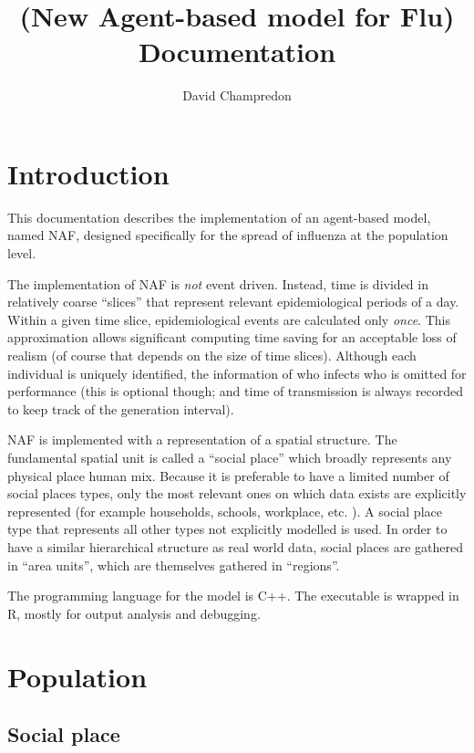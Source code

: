 \documentclass[11pt, onecolumn]{article}
\title{\naf (New Agent-based model for Flu) Documentation}
\author{David Champredon}
\newcommand{\naf}{\textsf{NAF}\xspace}
\begin{document}
\maketitle

\vspace{1cm}

\tableofcontents

\newpage

\section{Introduction}

This documentation describes the implementation of an agent-based model, named \naf, designed specifically for the spread of influenza at the population level. 

The implementation of \naf is \emph{not} event driven. Instead, time is divided in relatively coarse ``slices'' that represent relevant epidemiological periods of a day. Within a given time slice, epidemiological events are calculated only \emph{once}. This approximation allows significant computing time saving for an acceptable loss of realism (of course that depends on the size of time slices). Although each individual is uniquely identified, the information of who infects who is omitted for performance (this is optional though; and time of transmission is always recorded to keep track of the generation interval). 


\naf is implemented with a representation of a spatial structure. The fundamental spatial unit is called a ``social place'' which broadly represents any physical place human mix. Because it is preferable to have a limited number of social places types, only the most relevant ones on which data exists are explicitly represented (for example households, schools, workplace, etc. ). A social place type that represents all other types not explicitly modelled is used. 
In order to have a similar hierarchical structure as real world data, social places are gathered in ``area units'', which are themselves gathered in ``regions''.

The programming language for the model is C++. The executable is wrapped in R, mostly for output analysis and debugging.


\section{Population}

\subsection{Social place}
\end{document}
